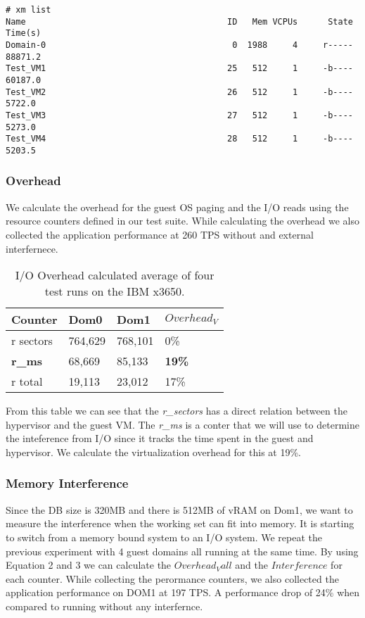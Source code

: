 \begin{Verbatim}
# xm list
Name                                        ID   Mem VCPUs      State   Time(s)
Domain-0                                     0  1988     4     r-----  88871.2
Test_VM1                                    25   512     1     -b----  60187.0
Test_VM2                                    26   512     1     -b----   5722.0
Test_VM3                                    27   512     1     -b----   5273.0
Test_VM4                                    28   512     1     -b----   5203.5
\end{Verbatim}

\subsubsection{Overhead}
We calculate the overhead for the guest OS paging and the I/O reads using the resource counters defined in our test suite.  While calculating the overhead we also collected the application performance at 260 TPS without and external interfernece.

\begin{table}[h]
\begin{tabular}{ l l l p{5cm} }
  Counter & Dom0 & Dom1 & $Overhead_V$ \\
  \hline
r sectors & 764,629 & 768,101 & 0\%  \\
\textbf{r\_ms} & 68,669 & 85,133 & \textbf{19\%} \\
r total   & 19,113 & 23,012 & 17\% \\
  \hline
\end{tabular}
\caption{I/O Overhead calculated average of four test runs on the IBM x3650.}
\label{fig:OverheadSmall}
\end{table}

From this table we can see that the \emph{r\_sectors} has a direct relation between the hypervisor and the guest VM.  The \emph{r\_ms} is a conter that we will use to determine the inteference from I/O since it tracks the time spent in the guest and hypervisor.  We calculate the virtualization overhead for this at 19\%.

\subsubsection{Memory Interference}
Since the DB size is 320MB and there is 512MB of vRAM on Dom1, we want to measure the interference when the working set can fit into memory.  
It is starting to switch from a memory bound system to an I/O system.
We repeat the previous experiment with 4 guest domains all running at the same time.
By using Equation 2 and 3 we can calculate the $Overhead_Vall$ and the $Interference$ for each counter.
While collecting the perormance counters, we also collected the application performance on DOM1 at 197 TPS.  A performance drop of 24\% when compared to running without any interfernce.

